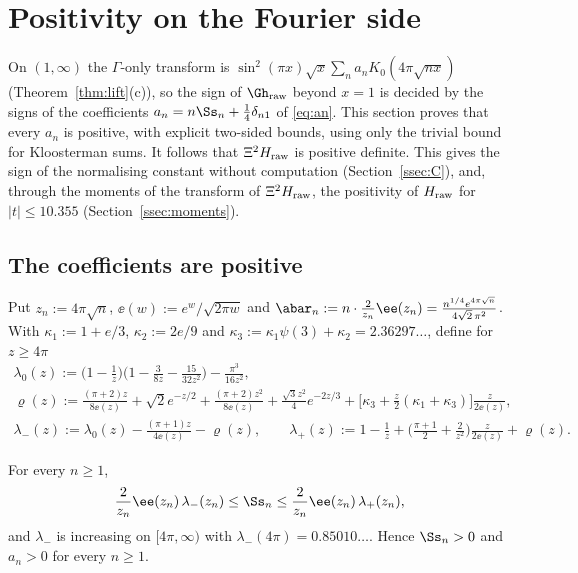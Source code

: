 \section{Positivity on the Fourier side}\label{sec:fourier}

On $(1,\infty)$ the $\Gamma$-only transform is $\sin^2(\pi x)\sqrt x\sum_na_nK_0(4\pi\sqrt{nx})$ (Theorem~\ref{thm:lift}(c)), so the sign of
$\Gh_{\rm raw}$ beyond $x=1$ is decided by the signs of the coefficients $a_n=n\Ss_n+\frac14\delta_{n1}$ of \eqref{eq:an}. This section proves that
every $a_n$ is positive, with explicit two-sided bounds, using only the trivial bound for Kloosterman sums. It follows that $\Xi^2H_{\rm raw}$ is
positive definite. This gives the sign of the normalising constant without computation (Section~\ref{ssec:C}), and, through the moments of the
transform of $\Xi^2H_{\rm raw}$, the positivity of $H_{\rm raw}$ for $|t|\le10.355$ (Section~\ref{ssec:moments}).

\subsection{The coefficients are positive}

Put $z_n:=4\pi\sqrt n$, $\ee(w):=e^w/\sqrt{2\pi w}$ and $\abar_n:=n\cdot\frac2{z_n}\ee(z_n)=\frac{n^{1/4}e^{4\pi\sqrt n}}{4\sqrt2\,\pi^2}$. With
$\kappa_1:=1+e/3$, $\kappa_2:=2e/9$ and $\kappa_3:=\kappa_1\psi(3)+\kappa_2=2.36297\ldots$, define for $z\ge4\pi$
\begin{gather*}
\lambda_0(z):=\Big(1-\frac1z\Big)\Big(1-\frac3{8z}-\frac{15}{32z^2}\Big)-\frac{\pi^3}{16z^2},\\
\varrho(z):=\frac{(\pi+2)z}{8\ee(z)}+\sqrt2e^{-z/2}+\frac{(\pi+2)z^2}{8\ee(z)}+\frac{\sqrt3z^2}4e^{-2z/3}+\Big[\kappa_3+\frac z2(\kappa_1+\kappa_3)\Big]\frac z{2\ee(z)},\\
\lambda_-(z):=\lambda_0(z)-\frac{(\pi+1)z}{4\ee(z)}-\varrho(z),\qquad \lambda_+(z):=1-\frac1z+\Big(\frac{\pi+1}2+\frac2{z^2}\Big)\frac z{2\ee(z)}+\varrho(z).
\end{gather*}

\begin{theorem}\label{thm:an-positive}
For every $n\ge1$,
\[
\frac2{z_n}\ee(z_n)\,\lambda_-(z_n)\le\Ss_n\le\frac2{z_n}\ee(z_n)\,\lambda_+(z_n),
\]
and $\lambda_-$ is increasing on $[4\pi,\infty)$ with $\lambda_-(4\pi)=0.85010\ldots$. Hence $\Ss_n>0$ and $a_n>0$ for every $n\ge1$.
\end{theorem}


